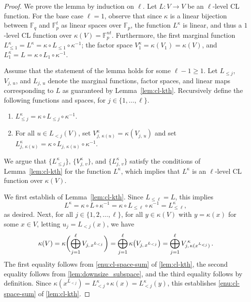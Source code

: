 \documentclass[11pt]{article}
\theoremstyle{definition}
\newcommand{\F}{\ensuremath{\mathbb{F}}}
\newcommand{\downsize}{\kappa}
\begin{document}
\begin{proof}
  We prove the lemma by induction on $\ell$.
  Let $L:V \to V$ be an $\ell$-level CL function.
  For the base case $\ell = 1$, observe that since $\downsize$ is a linear
  bijection between $\F_q$ and $\F_p^t$ as linear spaces over $\F_p$, the
  function $L^\downsize$ is linear, and thus a $1$-level CL function over
  $\downsize(V) = \F_p^{nt}$.
  Furthermore, the first marginal function $L^\downsize_{\leq 1} = L^\downsize =
  \downsize \circ L_{\leq 1} \circ \downsize^{-1}$; the factor space
  $V^\downsize_1 = \downsize(V_1) = \downsize(V)$, and $L^\downsize_1 = L =
  \downsize \circ L_1 \circ \downsize^{-1}$.

  Assume that the statement of the lemma holds for some $\ell - 1 \geq 1$.
  Let $L_{\leq j}$, $V_{j,\, u}$, and $L_{j,\, u}$ denote the marginal
  functions, factor spaces, and linear maps corresponding to $L$ as guaranteed
  by Lemma~\ref{lem:cl-kth}.
  Recursively define the following functions and spaces, for $j \in
  \{1,\ldots,\ell\}$.
  \begin{enumerate}
	\item $L^\downsize_{\leq j} = \downsize \circ L_{\leq j} \circ
    \downsize^{-1}$.
	\item For all $u \in L_{<j} (V)$, set $V_{j,\, \downsize(u)}^\downsize =
    \downsize(V_{j,\, u})$ and set $L_{j,\, \downsize(u)}^\downsize = \downsize
    \circ L_{j,\,\downsize( u)} \circ \downsize^{-1}$.
  \end{enumerate}
  We argue that $\{L^\downsize_{\leq j}\}$, $\{V^\downsize_{j,\, v}\}$, and
  $\{L_{j,\, v}^\downsize \}$ satisfy the conditions of Lemma~\ref{lem:cl-kth}
  for the function $L^\downsize$, which implies that $L^\downsize$ is an
  $\ell$-level CL function over $\downsize(V)$.

  We first establish  of Lemma~\ref{lem:cl-kth}.
  Since $L_{\leq \ell} = L$, this implies
  \begin{equation*}
	  L^\downsize = \downsize \circ L \circ \downsize^{-1}
    = \downsize \circ L_{\leq \ell} \circ \downsize^{-1}
    = L^{\downsize}_{\leq \ell},
  \end{equation*}
  as desired.
  Next, for all $j \in \{1, 2, \ldots, \ell\}$, for all $y \in \downsize(V)$
  with $y = \downsize(x)$ for some $x \in V$, letting $u_j = L_{<j}(x)$, we have
  \begin{equation*}
	  \downsize(V) = \downsize \biggl ( \bigoplus_{j=1}^\ell V_{j,\, \smash{x^{L_{<j}}}} \biggr)
    = \bigoplus_{j=1}^\ell \downsize \bigl( V_{j,\, \smash{x^{L_{<j}}}} \bigr)
    = \bigoplus_{j=1}^\ell V^{\,\downsize}_{j,\, \smash{\downsize(x^{L_{<j}})}}\,.
  \end{equation*}
  The first equality follows from \cref{enu:cl-space-sum} of \cref{lem:cl-kth},
  the second equality follows from \cref{lem:downsize_subspace}, and the third
  equality follows by definition.
  Since $\downsize(x^{L_{<j}}) = L^\downsize_{<j} \circ \downsize (x) =
  L^\downsize_{<j} (y)$, this establishes \cref{enu:cl-space-sum} of
  \cref{lem:cl-kth}.


\end{proof}
\end{document}

